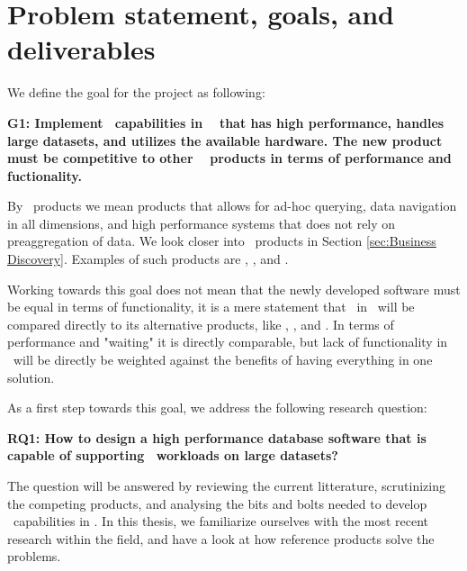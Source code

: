 \section{Problem statement, goals, and deliverables}
\label{sec:problem-statement-and-goals}

We define the goal for the project as following: 

\textbf{G1: Implement \bd~capabilities in \genusSoftware~ that has high performance, handles large datasets, and utilizes the available hardware. The new product must be competitive to other \bd~ products in terms of performance and fuctionality.}

By \bd~products we mean products that allows for ad-hoc querying, data navigation in all dimensions, and high performance systems that does not rely on preaggregation of data. We look closer into \bd~products in Section \ref{sec:Business Discovery}. Examples of such products are \qlikview, \tableau, and \powerpivot.

Working towards this goal does not mean that the newly developed software must be equal in terms of functionality, it is a mere statement that \bi~in \genusSoftware~will be compared directly to its alternative products, like \qlikview, \tableau, and \powerpivot. In terms of performance and "waiting" it is directly comparable, but lack of functionality in \genusSoftware~will be directly be weighted against the benefits of having everything in one solution.

As a first step towards this goal, we address the following research question:

\textbf{RQ1: How to design a high performance database software that is capable of supporting \bd~workloads on large datasets?} 

The question will be answered by reviewing the current litterature, scrutinizing the competing products, and analysing the bits and bolts needed to develop \bd~capabilities in \genusSoftware. In this thesis, we familiarize ourselves with the most recent research within the field, and have a look at how reference products solve the problems. 

